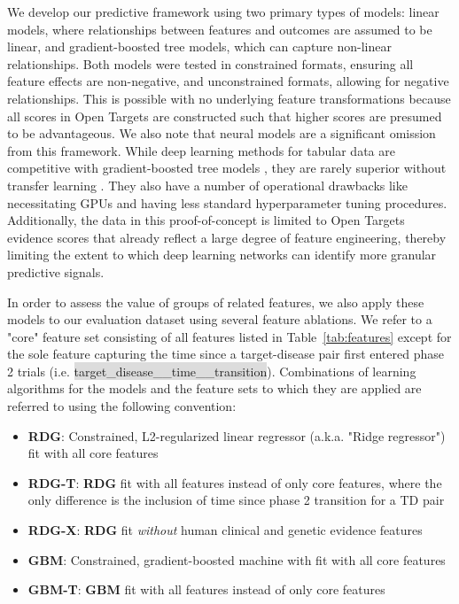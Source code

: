 \documentclass{article}
\begin{document}
We develop our predictive framework using two primary types of models: linear models, where relationships between features and outcomes are assumed to be linear, and gradient-boosted tree models, which can capture non-linear relationships. Both models were tested in constrained formats, ensuring all feature effects are non-negative, and unconstrained formats, allowing for negative relationships. This is possible with no underlying feature transformations because all scores in Open Targets are constructed such that higher scores are presumed to be advantageous. We also note that neural models are a significant omission from this framework. While deep learning methods for tabular data are competitive with gradient-boosted tree models \cite{mcelfresh2023neural, gorishniy2023revisiting, somepalli2021saint}, they are rarely superior without transfer learning \cite{mcelfresh2023neural, levin2023transfer, hollmann2023tabpfn}. They also have a number of operational drawbacks like necessitating GPUs and having less standard hyperparameter tuning procedures. Additionally, the data in this proof-of-concept is limited to Open Targets evidence scores that already reflect a large degree of feature engineering, thereby limiting the extent to which deep learning networks can identify more granular predictive signals.

In order to assess the value of groups of related features, we also apply these models to our evaluation dataset using several feature ablations. We refer to a "core" feature set consisting of all features listed in Table~\ref{tab:features} except for the sole feature capturing the time since a target-disease pair first entered phase 2 trials (i.e. \colorbox{Gainsboro}{target\_disease\_\_time\_\_transition}). Combinations of learning algorithms for the models and the feature sets to which they are applied are referred to using the following convention:

\begin{itemize}
  \item \textbf{RDG}: Constrained, L2-regularized linear regressor (a.k.a. "Ridge regressor") fit with all core features
  \item \textbf{RDG-T}: \textbf{RDG} fit with all features instead of only core features, where the only difference is the inclusion of time since phase 2 transition for a TD pair
  \item \textbf{RDG-X}: \textbf{RDG} fit \textit{without} human clinical and genetic evidence features
  \item \textbf{GBM}: Constrained, gradient-boosted machine with fit with all core features
  \item \textbf{GBM-T}: \textbf{GBM} fit with all features instead of only core features
\end{itemize}
\end{document}
